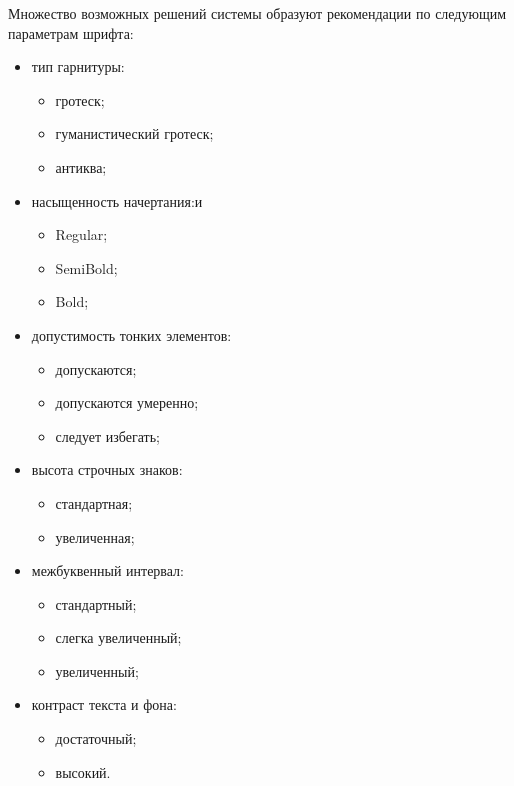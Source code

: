 Множество возможных решений системы образуют рекомендации по следующим параметрам шрифта:

\begin{itemize}
    \item тип гарнитуры:
    \begin{itemize}
        \item гротеск;
        \item гуманистический гротеск;
        \item антиква;
    \end{itemize}

    \item насыщенность начертания:и
    \begin{itemize}
        \item Regular;
        \item SemiBold;
        \item Bold;
    \end{itemize}

    \item допустимость тонких элементов:
    \begin{itemize}
        \item допускаются;
        \item допускаются умеренно;
        \item следует избегать;
    \end{itemize}

    \item высота строчных знаков:
    \begin{itemize}
        \item стандартная;
        \item увеличенная;
    \end{itemize}

    \item межбуквенный интервал:
    \begin{itemize}
        \item стандартный;
        \item слегка увеличенный;
        \item увеличенный;
    \end{itemize}

    \item контраст текста и фона:
    \begin{itemize}
        \item достаточный;
        \item высокий.
    \end{itemize}
\end{itemize}
